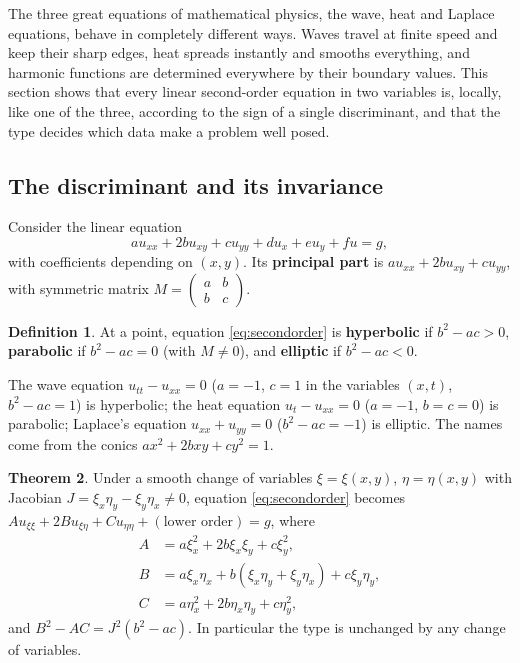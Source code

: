 \documentclass[11pt,a4paper]{article}
\numberwithin{equation}{section}
\theoremstyle{definition}
\newtheorem{thm}{Theorem}[subsection]
\newtheorem{defn}[thm]{Definition}
\begin{document}
The three great equations of mathematical physics, the wave, heat and Laplace equations, behave in completely different ways. Waves travel at finite speed and keep their sharp edges, heat spreads instantly and smooths everything, and harmonic functions are
determined everywhere by their boundary values. This section shows that every linear second-order equation in two variables is, locally, like one of the three, according to the sign of a single discriminant, and that the type decides which data make
a problem well posed.

\subsection{The discriminant and its invariance}
\label{ssec:discriminant}

Consider the linear equation
\begin{equation}
\label{eq:secondorder}
a u_{xx} + 2b u_{xy} + c u_{yy} + d u_x + e u_y + f u = g ,
\end{equation}
with coefficients depending on $(x, y)$. Its \textbf{principal part} is $a u_{xx} + 2b u_{xy} + c u_{yy}$, with symmetric matrix $M = \begin{pmatrix} a & b \\ b & c \end{pmatrix}$.

\begin{defn}
At a point, equation \eqref{eq:secondorder} is \textbf{hyperbolic} if $b^2 - ac > 0$, \textbf{parabolic} if $b^2 - ac = 0$ (with $M \neq 0$), and \textbf{elliptic} if $b^2 - ac < 0$.
\end{defn}

The wave equation $u_{tt} - u_{xx} = 0$ ($a = -1$, $c = 1$ in the variables $(x, t)$, $b^2 - ac = 1$) is hyperbolic; the heat equation $u_t - u_{xx} = 0$ ($a = -1$, $b = c = 0$) is parabolic; Laplace's equation $u_{xx} + u_{yy} = 0$ ($b^2 - ac = -1$) is elliptic.
The names come from the conics $ax^2 + 2bxy + cy^2 = 1$.

\begin{thm}
\label{thm:typeinvariant}
Under a smooth change of variables $\xi = \xi(x, y)$, $\eta = \eta(x, y)$ with Jacobian $J = \xi_x\eta_y - \xi_y\eta_x \neq 0$, equation \eqref{eq:secondorder} becomes $Au_{\xi\xi} + 2Bu_{\xi\eta} + Cu_{\eta\eta} + (\text{lower order}) = g$, where
\begin{align*}
A &= a\xi_x^2 + 2b\xi_x\xi_y + c\xi_y^2, \\
B &= a\xi_x\eta_x + b(\xi_x\eta_y + \xi_y\eta_x) + c\xi_y\eta_y, \\
C &= a\eta_x^2 + 2b\eta_x\eta_y + c\eta_y^2 ,
\end{align*}
and $B^2 - AC = J^2(b^2 - ac)$. In particular the type is unchanged by any change of variables.
\end{thm}
\end{document}
